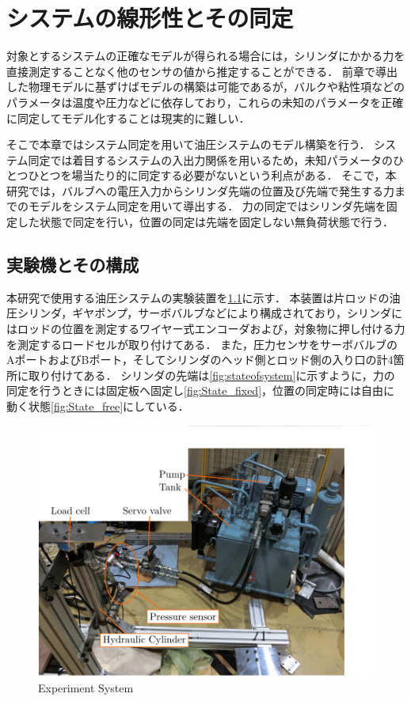 \chapter{システムの線形性とその同定}
\label{sec:SystemIdentification}
対象とするシステムの正確なモデルが得られる場合には，シリンダにかかる力を直接測定することなく他のセンサの値から推定することができる．
前章で導出した物理モデルに基ずけばモデルの構築は可能であるが，バルクや粘性項などのパラメータは温度や圧力などに依存しており，これらの未知のパラメータを正確に同定してモデル化することは現実的に難しい．

そこで本章ではシステム同定を用いて油圧システムのモデル構築を行う．
システム同定では着目するシステムの入出力関係を用いるため，未知パラメータのひとつひとつを場当たり的に同定する必要がないという利点がある．
そこで，本研究では，バルブへの電圧入力からシリンダ先端の位置及び先端で発生する力までのモデルをシステム同定を用いて導出する．
力の同定ではシリンダ先端を固定した状態で同定を行い，位置の同定は先端を固定しない無負荷状態で行う．
\section{実験機とその構成}
本研究で使用する油圧システムの実験装置を\figname\ref{fig:ExperimentSystem}に示す．
本装置は片ロッドの油圧シリンダ，ギヤポンプ，サーボバルブなどにより構成されており，シリンダにはロッドの位置を測定するワイヤー式エンコーダおよび，対象物に押し付ける力を測定するロードセルが取り付けてある．
また，圧力センサをサーボバルブのAポートおよびBポート，そしてシリンダのヘッド側とロッド側の入り口の計4箇所に取り付けてある．
シリンダの先端は\figname\ref{fig:stateofsystem}に示すように，力の同定を行うときには固定板へ固定し\figname\ref{fig:State_fixed}，位置の同定時には自由に動く状態\figname\ref{fig:State_free}にしている．
\begin{figure}[t]
    \centering
        \includegraphics[keepaspectratio, scale=1.0]{contents/SystemIdentification/figure/ExperimentSystem.png}
        \caption{Experiment System}
        \label{fig:ExperimentSystem}
\end{figure}

